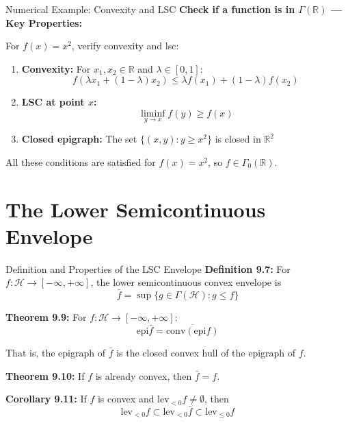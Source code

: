 \documentclass[aspectratio=169,10pt]{beamer}
\begin{document}
\begin{frame}[fragile]{Numerical Example: Convexity and LSC}
\textbf{Check if a function is in $\Gamma(\mathbb{R})$ --- Key Properties:}

\vspace{0.2cm}
\small
For $f(x) = x^2$, verify convexity and lsc:
\begin{enumerate}
    \item \textbf{Convexity:} For $x_1, x_2 \in \mathbb{R}$ and $\lambda \in [0,1]$:
        \[
        f(\lambda x_1 + (1-\lambda)x_2) \leq \lambda f(x_1) + (1-\lambda)f(x_2)
        \]
    
    \item \textbf{LSC at point $x$:} 
        \[
        \liminf_{y \to x} f(y) \geq f(x)
        \]
    
    \item \textbf{Closed epigraph:} The set $\{(x,y) : y \geq x^2\}$ is closed in $\mathbb{R}^2$
\end{enumerate}

\vspace{0.2cm}
All these conditions are satisfied for $f(x) = x^2$, so $f \in \Gamma_0(\mathbb{R})$.
\end{frame}

\section{The Lower Semicontinuous Envelope}

\begin{frame}{Definition and Properties of the LSC Envelope}
\textbf{Definition 9.7:} For $f: \mathcal{H} \to [-\infty, +\infty]$, the \alert{lower semicontinuous convex envelope} is
\[
\bar{f} = \sup \{g \in \Gamma(\mathcal{H}) : g \leq f\}
\]

\vspace{0.3cm}
\textbf{Theorem 9.9:} For $f: \mathcal{H} \to [-\infty, +\infty]$:
\[
\text{epi}\bar{f} = \overline{\text{conv}(\text{epi} f)}
\]

That is, the epigraph of $\bar{f}$ is the closed convex hull of the epigraph of $f$.

\vspace{0.3cm}
\textbf{Theorem 9.10:} If $f$ is already convex, then $\bar{f} = f$.

\vspace{0.3cm}
\textbf{Corollary 9.11:} If $f$ is convex and $\text{lev}_{<0} f \neq \emptyset$, then
\[
\text{lev}_{<0} f \subset \text{lev}_{<0} \bar{f} \subset \text{lev}_{\leq 0} f
\]
\end{frame}
\end{document}
